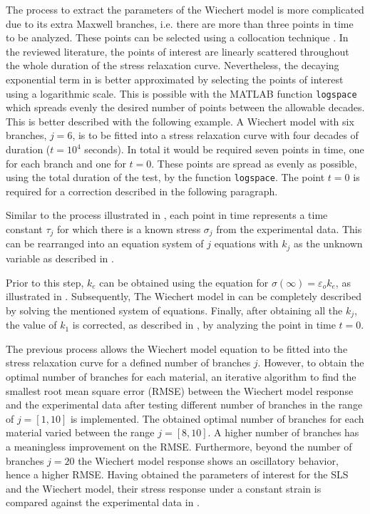 The process to extract the parameters of the Wiechert model is more complicated due to its extra Maxwell branches, i.e. there are more than three points in time to be analyzed. These points can be selected using a collocation technique \cite{roylance2001engineering,machiraju2006viscoelastic}. In the reviewed literature, the points of interest are linearly scattered throughout the whole duration of the stress relaxation curve. Nevertheless, the decaying exponential term in  is better approximated by selecting the points of interest using a logarithmic scale. This is possible with the MATLAB function \texttt{logspace} which spreads evenly the desired number of points between the allowable decades. 
This is better described with the following example. A Wiechert model with six branches, $j=6$, is to be fitted into a stress relaxation curve with four decades of duration ($t=10^4$ seconds). In total it would be required seven points in time, one for each branch and one for $t=0$. These points are spread as evenly as possible, using the total duration of the test, by the function \texttt{logspace}. The point $t=0$ is required for a correction described in the following paragraph. 

Similar to the process illustrated in , each point in time represents a time constant $\tau_j$ for which there is a known stress $\sigma_j$ from the experimental data. This can be rearranged into an equation system of $j$ equations with $k_j$ as the unknown variable as described in \cite{machiraju2006viscoelastic}. 


Prior to this step, $k_e$ can be obtained using the equation for $\sigma(\infty)=\varepsilon_o k_e$, as illustrated in . Subsequently, The Wiechert model in  can be completely described by solving the mentioned system of equations. Finally, after obtaining all the $k_j$, the value of $k_1$ is corrected, as described in \cite{roylance2001engineering}, by analyzing the point in time $t=0$.

The previous process allows the Wiechert model equation to be fitted into the stress relaxation curve for a defined number of branches $j$. However, to obtain the optimal number of branches for each material, an iterative algorithm to find the smallest root mean square error (RMSE) between the Wiechert model response and the experimental data after testing different number of branches in the range of $j=[1,10]$ is implemented. The obtained optimal number of branches for each material varied between the range $j=[8,10]$. A higher number of branches has a meaningless improvement on the RMSE. Furthermore, beyond the number of branches $j=20$ the Wiechert model response shows an oscillatory behavior, hence a higher RMSE. Having obtained the parameters of interest for the SLS and the Wiechert model, their stress response under a constant strain is compared against the experimental data in .


